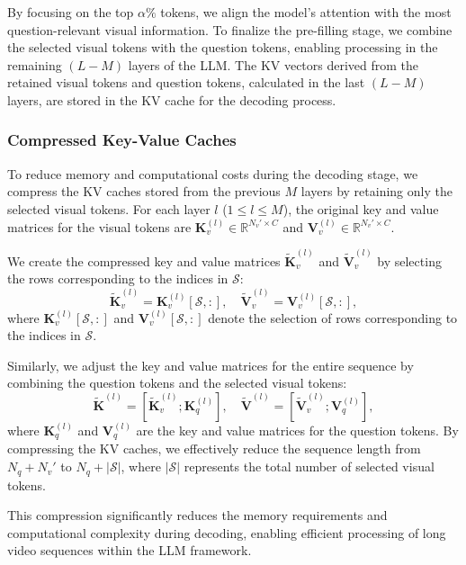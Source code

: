 \documentclass{article} %
\begin{document}
By focusing on the top $\alpha\%$ tokens, we align the model's attention with the most question-relevant visual information. To finalize the pre-filling stage, we combine the selected visual tokens with the question tokens, enabling processing in the remaining $(L - M)$ layers of the LLM. The KV vectors derived from the retained visual tokens and question tokens, calculated in the last $(L - M)$ layers, are stored in the KV cache for the decoding process.

\subsubsection{Compressed Key-Value Caches}

To reduce memory and computational costs during the decoding stage, we compress the KV caches stored from the previous $M$ layers by retaining only the selected visual tokens. For each layer $l$ ($1 \leq l \leq M$), the original key and value matrices for the visual tokens are $\bm{K}_v^{(l)} \in \mathbb{R}^{N_v' \times C}$ and $\bm{V}_v^{(l)} \in \mathbb{R}^{N_v' \times C}$.

We create the compressed key and value matrices $\tilde{\bm{K}}_v^{(l)}$ and $\tilde{\bm{V}}_v^{(l)}$ by selecting the rows corresponding to the indices in $\mathcal{S}$:
\begin{equation}
    \tilde{\bm{K}}_v^{(l)} = \bm{K}_v^{(l)}\left[ \mathcal{S}, : \right], \quad \tilde{\bm{V}}_v^{(l)} = \bm{V}_v^{(l)}\left[ \mathcal{S}, : \right],
\end{equation}
where $\bm{K}_v^{(l)}\left[ \mathcal{S}, : \right]$ and $\bm{V}_v^{(l)}\left[ \mathcal{S}, : \right]$ denote the selection of rows corresponding to the indices in $\mathcal{S}$.

Similarly, we adjust the key and value matrices for the entire sequence by combining the question tokens and the selected visual tokens:
\begin{equation}
    \tilde{\bm{K}}^{(l)} = \left[ \tilde{\bm{K}}_v^{(l)} ; \bm{K}_q^{(l)} \right], \quad \tilde{\bm{V}}^{(l)} = \left[ \tilde{\bm{V}}_v^{(l)} ; \bm{V}_q^{(l)} \right],
\end{equation}
where $\bm{K}_q^{(l)}$ and $\bm{V}_q^{(l)}$ are the key and value matrices for the question tokens.
By compressing the KV caches, we effectively reduce the sequence length from $N_q + N_v'$ to $N_q + |\mathcal{S}|$, where $|\mathcal{S}|$ represents the total number of selected visual tokens.

This compression significantly reduces the memory requirements and computational complexity during decoding, enabling efficient processing of long video sequences within the LLM framework.
\end{document}
